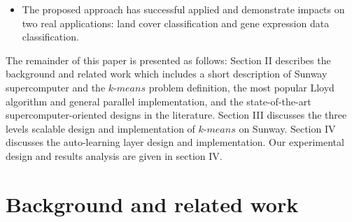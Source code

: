 \documentclass[10pt,journal,compsoc]{IEEEtran}
\begin{document}
\begin{itemize}
\item The proposed approach has successful applied and demonstrate impacts on two real applications: land cover classification and gene expression data classification.
\end{itemize}
 
The remainder of this paper is presented as follows: Section II describes the background and related work which includes a short description of Sunway supercomputer and the $k$-$means$ problem definition, the most popular Lloyd algorithm and general parallel implementation, and the state-of-the-art supercomputer-oriented designs in the literature. Section III discusses the three levels scalable design and implementation of $k$-$means$ on Sunway. Section IV discusses the auto-learning layer design and implementation. Our experimental design and results analysis are given in section IV. 




\section{Background and related work}
\end{document}
